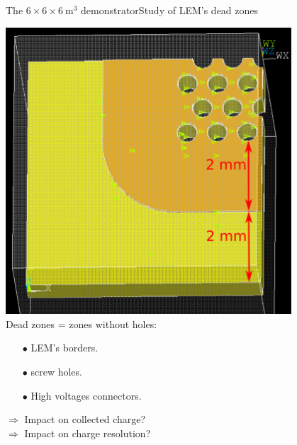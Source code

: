 \documentclass[10pt]{beamer}
\begin{document}
    \begin{frame}{The \texorpdfstring{$6 \times 6 \times \SI{6}{\meter\cubed}$}{666}
    		 demonstrator}{Study of LEM's dead zones}
   		\begin{scriptsize}
    		\begin{minipage}{0.38\textwidth}
    			\includegraphics[width=0.8\textwidth]{figures/666/corner_annotations.png}
    			\vspace{0.5cm}\\
    				Dead zones = zones without holes:
    				\begin{itemize}
    					\item[$\bullet$] LEM's borders.
    					\item[$\bullet$] screw holes.
    					\item[$\bullet$] High voltages connectors.
    				\end{itemize}
    				$\Rightarrow$ Impact on collected charge?\\
    				$\Rightarrow$ Impact on charge resolution?\\
    				

\end{minipage}
\end{scriptsize}
\end{frame}
\end{document}

